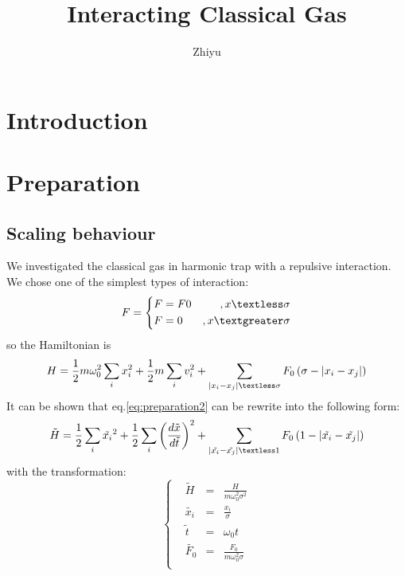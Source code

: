\documentclass[aps,pre,twocolumn
,groupedaddress]{revtex4-1}
\begin{document}
 \title{Interacting Classical Gas}
 \author{Zhiyu}
 
 
\begin{abstract}
\end{abstract}
 \maketitle
\section{Introduction}


\section{Preparation}
\subsection{Scaling behaviour}
We investigated the classical gas in harmonic trap with a repulsive interaction. We chose one of the simplest types of interaction:
\begin{equation}
F=\left\lbrace
\begin{aligned}
&F=F0 	&,x\textless\sigma\\
&F=0 	&,x\textgreater\sigma
\end{aligned}
\right.
\label{eq:preparation1}
\end{equation}
so the Hamiltonian is
\begin{equation}
H=\frac{1}{2}m\omega_0^2\sum_{i}x_i^2+\frac{1}{2}m\sum_i v_i^2+\sum_{\left|x_i-x_j\right|\textless\sigma}F_0\left(\sigma-\left|x_i-x_j\right|\right)
\label{eq:preparation2}
\end{equation}
It can be shown that eq.\ref{eq:preparation2} can be rewrite into the following form:
\begin{equation}
\tilde{H}=\frac{1}{2}\sum_{i}\tilde{x_i}^2+\frac{1}{2}\sum_i\left(\frac{d\tilde{x}}{d\tilde{t}}\right)^2+\sum_{\left|\tilde{x_i}-\tilde{x_j}\right|\textless 1}F_0\left(1-\left|\tilde{x_i}-\tilde{x_j}\right|\right)
\end{equation}
with the transformation:
\begin{equation}
\left\lbrace
\begin{aligned}
&\tilde{H}&=&\frac{H}{m\omega_0^2\sigma^2}\\
&\tilde{x_i}&=&\frac{x_i}{\sigma}\\
&\tilde{t}&=&\omega_0t\\
&\tilde{F_0}&=&\frac{F_0}{m\omega_0^2\sigma}\\
\end{aligned}
\right.
\end{equation}
\end{document}
